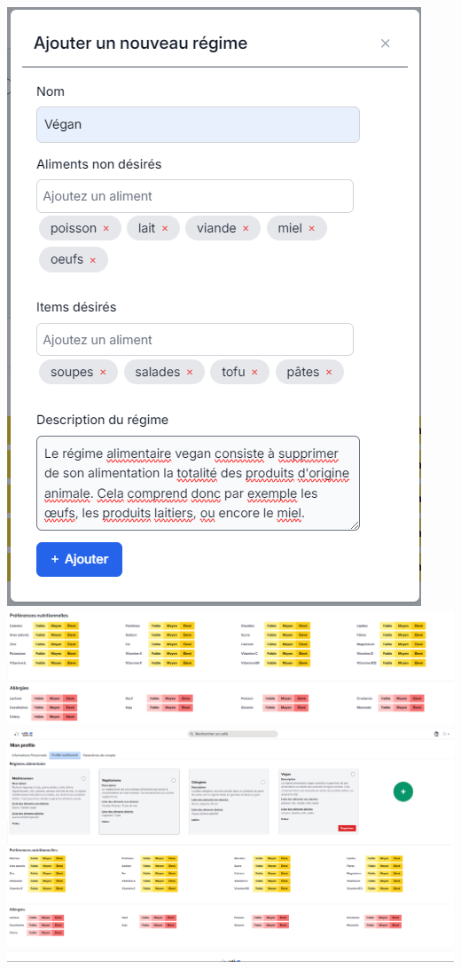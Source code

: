 \documentclass[11pt]{article}
\begin{document}
\includegraphics[scale=0.5]{images/add_new_diet.png} \\

\includegraphics[scale=0.5]{images/preferences_allergenes.png} \\

\includegraphics[scale=0.3]{images/full_profile.png} 
\newpage
\end{document}
